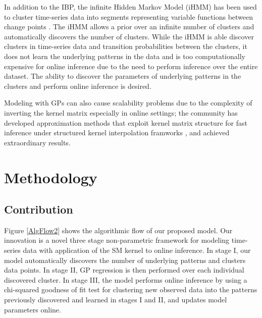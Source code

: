 \documentclass{article}
\begin{document}
In addition to the IBP, the infinite Hidden Markov Model (iHMM) has been used to cluster time-series data into segments representing variable functions between change points \cite{BeamiHMM}. The iHMM allows a prior over an infinite number of clusters and automatically discovers the number of clusters. While the iHMM is able discover clusters in time-series data and transition probabilities between the clusters, it does not learn the underlying patterns in the data and is too computationally expensive for online inference due to the need to perform inference over the entire dataset. The ability to discover the parameters of underlying patterns in the clusters and perform online inference is desired.

Modeling with GPs can also cause scalability problems due to the complexity of inverting the kernel matrix especially in online settings; the community has developed approximation methods that exploit kernel matrix structure for fast inference under structured kernel interpolation framworks \cite{KISS-GP}, and achieved extraordinary results. 


\section{Methodology}

\subsection{Contribution}
Figure \ref{AlgFlow2} shows the algorithmic flow of our proposed model. Our innovation is a novel three stage non-parametric framework for modeling time-series data with application of the SM kernel to online inference. In stage I, our model automatically discovers the number of underlying patterns and clusters data points. In stage II, GP regression is then performed over each individual discovered cluster. In stage III, the model performs online inference by using a chi-squared goodness of fit test for clustering new observed data into the patterns previously discovered and learned in stages I and II, and updates model parameters online. 
\end{document}

